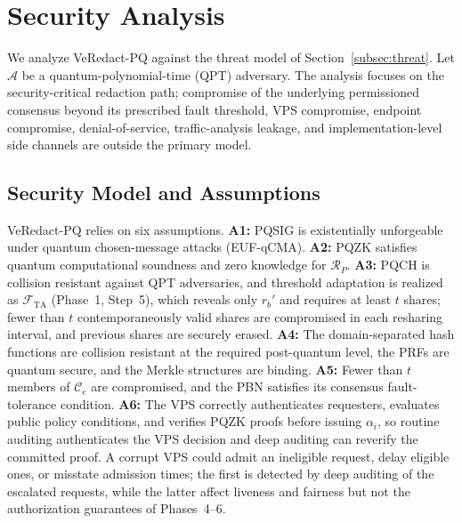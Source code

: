 \documentclass[lettersize,journal]{IEEEtran}
\begin{document}
    
    
    

\section{Security Analysis}
\label{sec:security}

We analyze VeRedact-PQ against the threat model of Section~\ref{subsec:threat}.
Let $\mathcal{A}$ be a quantum-polynomial-time (QPT) adversary.
The analysis focuses on the security-critical redaction path; compromise
of the underlying permissioned consensus beyond its prescribed fault
threshold, VPS compromise, endpoint compromise, denial-of-service,
traffic-analysis leakage, and implementation-level side channels are
outside the primary model.

\subsection{Security Model and Assumptions}

VeRedact-PQ relies on six assumptions.
\textbf{A1:} PQSIG is existentially unforgeable under quantum
chosen-message attacks (EUF-qCMA).
\textbf{A2:} PQZK satisfies quantum computational soundness and zero
knowledge for $\mathcal{R}_P$.
\textbf{A3:} PQCH is collision resistant against QPT adversaries, and
threshold adaptation is realized as $\mathcal{F}_{\mathrm{TA}}$
(Phase~1, Step~5), which reveals only $r_b'$ and requires at least $t$
shares; fewer than $t$ contemporaneously valid shares are compromised in
each resharing interval, and previous shares are securely erased.
\textbf{A4:} The domain-separated hash functions are collision resistant
at the required post-quantum level, the PRFs are quantum secure, and the
Merkle structures are binding.
\textbf{A5:} Fewer than $t$ members of $\mathcal{C}_e$ are compromised,
and the PBN satisfies its consensus fault-tolerance condition.
\textbf{A6:} The VPS correctly authenticates requesters, evaluates public
policy conditions, and verifies PQZK proofs before issuing $\alpha_i$, so
routine auditing authenticates the VPS decision and deep auditing can
reverify the committed proof. A corrupt VPS could admit an ineligible
request, delay eligible ones, or misstate admission times; the first is
detected by deep auditing of the escalated requests, while the latter
affect liveness and fairness but not the authorization guarantees of
Phases~4--6.
\end{document}
